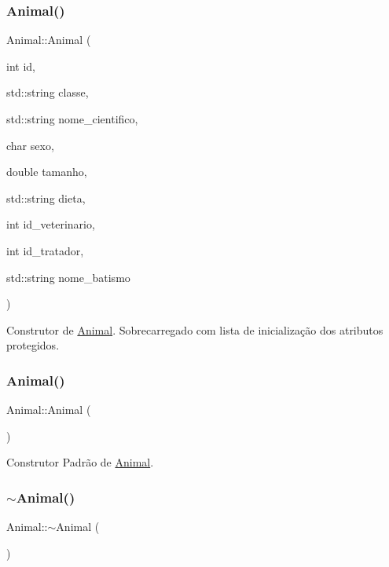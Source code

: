 \subsubsection{\texorpdfstring{Animal()}{Animal()}\hspace{0.1cm}{\footnotesize\ttfamily [1/2]}}
{\footnotesize\ttfamily Animal\+::\+Animal (\begin{DoxyParamCaption}\item[{int}]{id,  }\item[{std\+::string}]{classe,  }\item[{std\+::string}]{nome\+\_\+cientifico,  }\item[{char}]{sexo,  }\item[{double}]{tamanho,  }\item[{std\+::string}]{dieta,  }\item[{int}]{id\+\_\+veterinario,  }\item[{int}]{id\+\_\+tratador,  }\item[{std\+::string}]{nome\+\_\+batismo }\end{DoxyParamCaption})}

Construtor de \hyperlink{classAnimal}{Animal}. Sobrecarregado com lista de inicialização dos atributos protegidos. \mbox{\label{classAnimal_a1e726a49ec952443190ac62dad22353c}} 
\subsubsection{\texorpdfstring{Animal()}{Animal()}\hspace{0.1cm}{\footnotesize\ttfamily [2/2]}}
{\footnotesize\ttfamily Animal\+::\+Animal (\begin{DoxyParamCaption}{ }\end{DoxyParamCaption})}

Construtor Padrão de \hyperlink{classAnimal}{Animal}. \mbox{\label{classAnimal_a476af25adde5f0dfa688129c8f86fa5c}} 
\subsubsection{\texorpdfstring{$\sim$\+Animal()}{~Animal()}}
{\footnotesize\ttfamily Animal\+::$\sim$\+Animal (\begin{DoxyParamCaption}{ }\end{DoxyParamCaption})}

